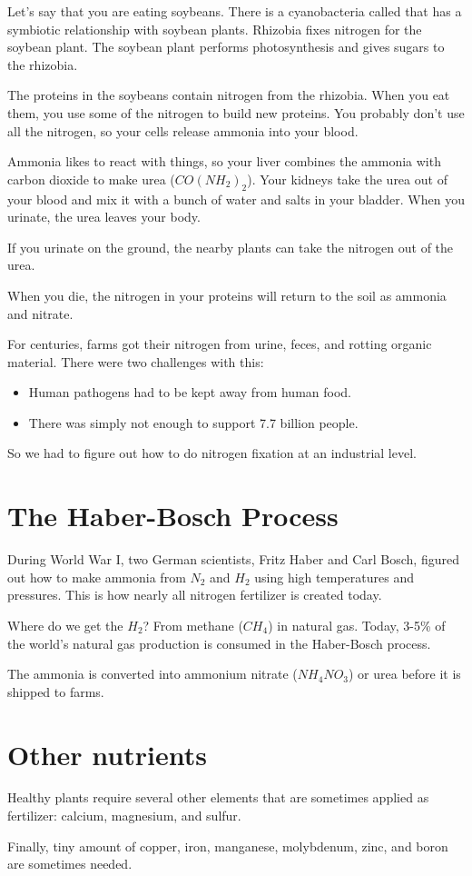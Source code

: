 Let's say that you are eating soybeans. There is a cyanobacteria
called  that has a symbiotic relationship with
soybean plants.  Rhizobia fixes nitrogen for the soybean plant. The
soybean plant performs photosynthesis and gives sugars to the
rhizobia.

The proteins in the soybeans contain nitrogen from the rhizobia. When
you eat them, you use some of the nitrogen to build new proteins. You
probably don't use all the nitrogen, so your cells release ammonia into your blood.

Ammonia likes to react with things, so your liver combines the ammonia
with carbon dioxide to make urea ($CO(NH_2)_2$).  Your kidneys take
the urea out of your blood and mix it with a bunch of water and salts
in your bladder.  When you urinate, the urea leaves your body.

If you urinate on the ground, the nearby plants can take the nitrogen out of
the urea.

When you die, the nitrogen in your proteins will return to the soil as
ammonia and nitrate.

For centuries, farms got their nitrogen from urine, feces, and rotting
organic material. There were two challenges with this:
\begin{itemize}
\item Human pathogens had to be kept away from human food.
\item There was simply not enough to support 7.7 billion people.
\end{itemize}

So we had to figure out how to do nitrogen fixation at an industrial
level.

\section{The Haber-Bosch Process}

During World War I, two German scientists, Fritz Haber and Carl Bosch,
figured out how to make ammonia from $N_2$ and $H_2$ using high
temperatures and pressures. This is how nearly all nitrogen fertilizer
is created today.

Where do we get the $H_2$? From methane ($CH_4$) in natural gas. Today, 3-5\%
of the world's natural gas production is consumed in the Haber-Bosch
process.

The ammonia is converted into ammonium nitrate ($NH_4NO_3$) or urea
before it is shipped to farms.

\section{Other nutrients}

Healthy plants require several other elements that are sometimes
applied as fertilizer: calcium, magnesium, and sulfur.

Finally, tiny amount of copper, iron, manganese, molybdenum, zinc, and
boron are sometimes needed.
